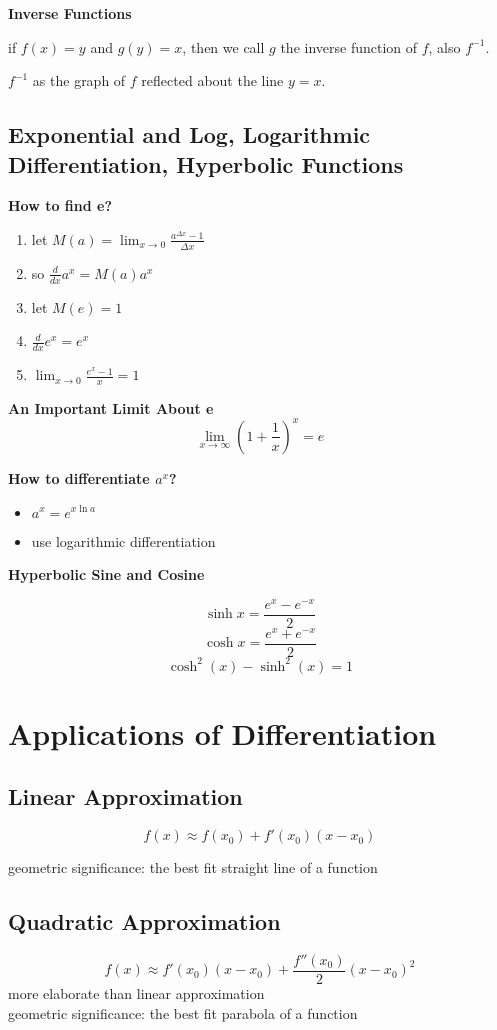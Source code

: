 \documentclass{article}
\newcommand\limitx[1]{\lim_{x \to #1}}
\begin{document}
\textbf{Inverse Functions}

if $f(x) = y$ and $g(y) = x$, then we call $g$ the inverse function of $f$, also $f^{-1}$.

$f^{-1}$ as the graph of $f$ reflected about the line $y = x$.

\subsection{Exponential and Log, Logarithmic Differentiation, Hyperbolic Functions}

\textbf{How to find e?}
\begin{enumerate}
  \item let $M(a) = \limitx{0}\frac{a^{\Delta x} - 1}{\Delta x}$
  \item so $\frac{d}{dx}a^x = M(a)a^x$
  \item let $M(e) = 1$
  \item $\frac{d}{dx}e^x = e^x$
  \item $\limitx{0}\frac{e^x - 1}{x} = 1$
\end{enumerate}

\textbf{An Important Limit About e}
$$\limitx{\infty}(1 + \frac{1}{x})^x = e$$

\textbf{How to differentiate $a^x$?}

\begin{itemize}
  \item $a^x = e^{x\ln a}$
  \item use logarithmic differentiation
\end{itemize}

\textbf{Hyperbolic Sine and Cosine}

$$\sinh x = \frac{e^x - e^{-x}}{2}$$
$$\cosh x = \frac{e^x + e^{-x}}{2}$$
$$\cosh ^2(x) - \sinh ^2(x) = 1$$

\section{Applications of Differentiation}
\subsection{Linear Approximation}

$$f(x) \approx f(x_0) + f'(x_0)(x-x_0)$$

geometric significance: the best fit straight line of a function

\subsection{Quadratic Approximation}
$$f(x) \approx f'(x_0)(x-x_0) + \frac{f''(x_0)}{2}(x-x_0)^2$$
more elaborate than linear approximation \\
geometric significance: the best fit parabola of a function
\end{document}
